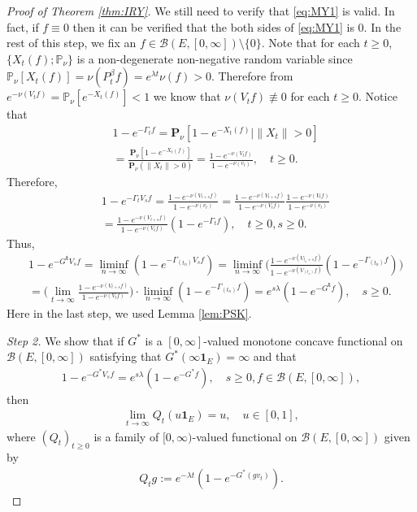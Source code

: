 \documentclass[12pt,a4paper]{amsart}
\numberwithin{equation}{section}
\theoremstyle{plain}
\theoremstyle{definition}
\begin{document}
\begin{proof}[Proof of Theorem \ref{thm:IRY}]
  We still need to verify that \eqref{eq:MY1} is valid.
  In fact, if $f\equiv 0$ then it can be verified that the both sides of \eqref{eq:MY1} is $0$.
  In the rest of this step, we fix an $f\in \mathcal B(E,[0,\infty])\setminus \{0\}$.
  Note that for each $t\geq 0$, $\{X_t(f);\mathbb P_\nu\}$ is a non-degenerate non-negative random variable since $\mathbb P_\nu[X_t(f)] = \nu(P_t^\beta f) = e^{\lambda t}\nu(f)>0$. 
  Therefore from $e^{-\nu(V_tf)} = \mathbb P_\nu[e^{-X_t(f)}] < 1$ we know that $\nu(V_tf) \not\equiv 0$ for each $t\geq 0$.  
  Notice that
  \begin{align}
    \label{eq:MY2}
    & 1 - e^{- \Gamma_t f} 
    = \mathbf P_\nu [ 1 - e^{-X_t(f)} | \|X_t\|> 0] \\
    & = \frac{ \mathbf P_\nu [ 1 - e^{- X_t(f)}]}{ \mathbf P_\nu (\|X_t\| > 0)}
    = \frac{ 1 - e^{- \nu(V_tf)} }{ 1 - e^{- \nu(v_t)}},
    \quad t \geq 0.
  \end{align}
  Therefore,
  \begin{align}
    & 1 - e^{- \Gamma_t V_s f}
      = \frac{ 1 - e^{- \nu(V_{t+s} f)} }{ 1 - e^{- \nu(v_t)}}
     = \frac{ 1 - e^{- \nu(V_{t+s} f)} }{ 1 - e^{- \nu(V_tf)}} \frac{ 1 - e^{ - \nu(V_tf)}}{ 1 - e^{- \nu(v_t)}} \\
    & = \frac{ 1 - e^{- \nu(V_{t+s} f)} }{ 1 - e^{- \nu(V_tf)}} ( 1 - e^{- \Gamma_t f})
      , \quad t\geq 0, s \geq 0.
  \end{align}
  Thus,
  \begin{align}
    & 1 - e^{- G^{\mathbf t} V_s f}
      = \liminf_{n\to \infty} ( 1 - e^{- \Gamma_{(t_n)} V_s f})
      = \liminf_{n\to \infty} \Big(  \frac{ 1 - e^{- \nu(V_{t_n+s}f)}}{ 1 - e^{- \nu(V_{(t_n)}f)}} (1 - e^{- \Gamma_{(t_n)} f}) \Big) \\
    & = \Big( \lim_{t \to \infty}   \frac{ 1 - e^{- \nu(V_{t+s}f)}}{ 1 - e^{- \nu(V_{t}f)}} \Big) \cdot \liminf_{n\to \infty} (1 - e^{- \Gamma_{(t_n)} f} ) 
      = e^{s\lambda} (1 - e^{- G^{\mathbf t}f}), \quad s\geq 0.
  \end{align}
  Here in the last step, we used Lemma \ref{lem:PSK}.

  \emph{Step 2.}
  We show that if $G^*$ is a $[0,\infty]$-valued monotone concave functional on $\mathcal B(E,[0,\infty])$ satisfying that $G^*(\infty \mathbf 1_E) = \infty$ and that 
  \begin{align}
    1 - e^{- G^* V_sf} = e^{s\lambda} (1- e^{- G^* f}),
    \quad s \geq 0, f \in \mathcal B(E, [0,\infty]),
  \end{align}
  then
  \begin{align}
    \lim_{t\to \infty} Q_t(u \mathbf 1_E) 
    = u,
    \quad u \in [0,1],
  \end{align}
  where $(Q_t)_{t\geq 0}$ is a family of $[0,\infty)$-valued functional on $\mathcal B(E,[0,\infty])$ given by
  \begin{align}
    Q_tg 
    := e^{- \lambda t}( 1 - e^{-G^*(gv_t)} ).
  \end{align}


\end{proof}
\end{document}
